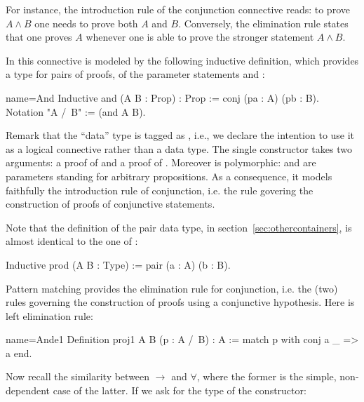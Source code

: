 For instance, the introduction rule of the conjunction
connective
reads: to prove $A \wedge B$ one needs to prove both
$A$ and $B$. Conversely, the elimination rule states that one proves 
$A$ whenever one is
able to prove the stronger statement $A \wedge B$.

In \Coq{} this connective is modeled by the following inductive
definition, which provides a type for pairs of proofs, of the
parameter statements  and :

\begin{coq}{name=And}{}
Inductive and (A B : Prop) : Prop := conj (pa : A) (pb : B).
Notation "A /\ B" := (and A B).
\end{coq}

Remark that the ``data'' type  is tagged as , i.e.,  we declare
the intention to use it as a logical connective rather than a data type.  The
single constructor  takes two
arguments: a proof of  and a proof of .
Moreover  is polymorphic:
 and  are parameters standing for arbitrary propositions.
As a consequence, it models faithfully the introduction rule of
conjunction, i.e. the rule govering the construction of proofs of
conjunctive statements.

Note that the definition of the pair data type,
in section~\ref{sec:othercontainers}, is almost identical to the one
of :

\begin{coq}{}{}
Inductive prod (A B : Type) := pair (a : A) (b : B).
\end{coq}

Pattern matching provides the elimination rule for
conjunction, i.e. the (two) rules governing the construction of proofs
using a conjunctive hypothesis. Here is left elimination rule:

\begin{coq}{name=Ande1}{}
Definition proj1 A B (p : A /\ B) : A :=
  match p with conj a _ => a end.
\end{coq}

Now recall the similarity between $\to$ and $\forall$, where the former is the
simple, non-dependent case of the latter.  If we ask for the type of
the  constructor:

